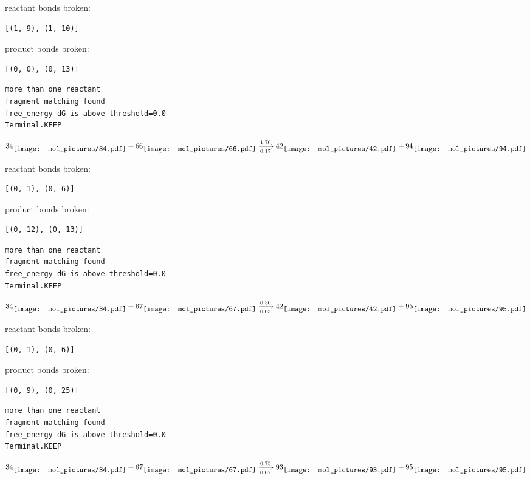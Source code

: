 \documentclass{article}
\begin{document}
reactant bonds broken:\begin{verbatim}
[(1, 9), (1, 10)]
\end{verbatim}
product bonds broken:\begin{verbatim}
[(0, 0), (0, 13)]
\end{verbatim}




\vspace{1cm}
\begin{verbatim}
more than one reactant
fragment matching found
free_energy dG is above threshold=0.0
Terminal.KEEP
\end{verbatim}
$$
34
\raisebox{-.5\height}{\texttt{[image: mol\_pictures/34.pdf]}}
+
66
\raisebox{-.5\height}{\texttt{[image: mol\_pictures/66.pdf]}}
\xrightarrow[0.17]{1.70}
42
\raisebox{-.5\height}{\texttt{[image: mol\_pictures/42.pdf]}}
+
94
\raisebox{-.5\height}{\texttt{[image: mol\_pictures/94.pdf]}}
$$


reactant bonds broken:\begin{verbatim}
[(0, 1), (0, 6)]
\end{verbatim}
product bonds broken:\begin{verbatim}
[(0, 12), (0, 13)]
\end{verbatim}




\vspace{1cm}
\begin{verbatim}
more than one reactant
fragment matching found
free_energy dG is above threshold=0.0
Terminal.KEEP
\end{verbatim}
$$
34
\raisebox{-.5\height}{\texttt{[image: mol\_pictures/34.pdf]}}
+
67
\raisebox{-.5\height}{\texttt{[image: mol\_pictures/67.pdf]}}
\xrightarrow[0.03]{0.30}
42
\raisebox{-.5\height}{\texttt{[image: mol\_pictures/42.pdf]}}
+
95
\raisebox{-.5\height}{\texttt{[image: mol\_pictures/95.pdf]}}
$$


reactant bonds broken:\begin{verbatim}
[(0, 1), (0, 6)]
\end{verbatim}
product bonds broken:\begin{verbatim}
[(0, 9), (0, 25)]
\end{verbatim}




\vspace{1cm}
\begin{verbatim}
more than one reactant
fragment matching found
free_energy dG is above threshold=0.0
Terminal.KEEP
\end{verbatim}
$$
34
\raisebox{-.5\height}{\texttt{[image: mol\_pictures/34.pdf]}}
+
67
\raisebox{-.5\height}{\texttt{[image: mol\_pictures/67.pdf]}}
\xrightarrow[0.07]{0.75}
93
\raisebox{-.5\height}{\texttt{[image: mol\_pictures/93.pdf]}}
+
95
\raisebox{-.5\height}{\texttt{[image: mol\_pictures/95.pdf]}}
$$
\end{document}
